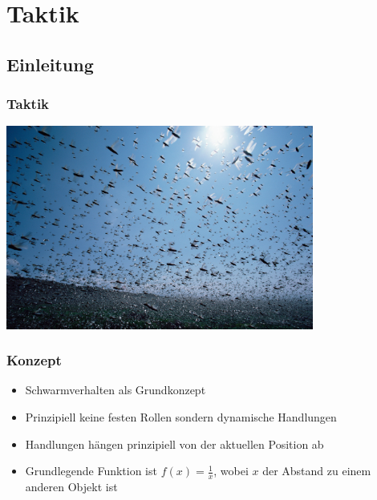 \section{Taktik}


\subsection{Einleitung}
\frame
{\frametitle{Taktik}
\begin{center}\includegraphics[height=6.7cm, center]{Invasion.jpg}\end{center}
}
\frame
{
  \frametitle{Konzept}
  \begin{itemize}
    \item Schwarmverhalten als Grundkonzept
    \item Prinzipiell keine festen Rollen sondern dynamische Handlungen
    \item Handlungen hängen prinzipiell von der aktuellen Position ab
    \item Grundlegende Funktion ist $f(x) = \frac 1 x$, wobei $x$ der Abstand zu einem anderen Objekt ist
  \end{itemize}
}

